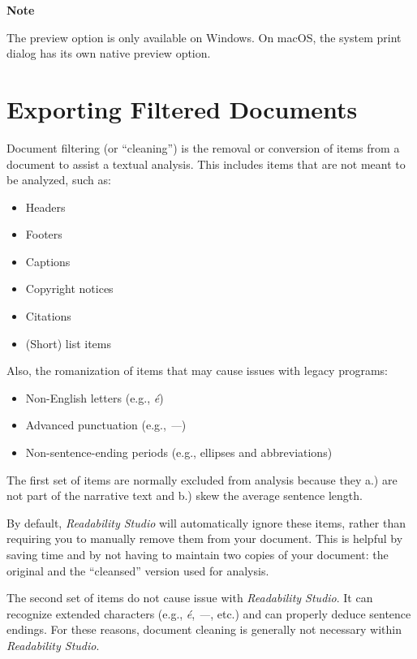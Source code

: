 \documentclass[
]{book}
\providecommand{\tightlist}{%
  \setlength{\itemsep}{0pt}\setlength{\parskip}{0pt}}
\newenvironment{notesection}
    {
    \begin{tcolorbox}[colframe=mediumblue,colback=lightblue,coltext=mediumblue,arc=3mm]
    \faLightbulb[regular] \textbf{Note} \newline
    }
    {
    \end{tcolorbox}
    }
\theoremstyle{definition}
\theoremstyle{definition}
\theoremstyle{definition}
\theoremstyle{definition}
\theoremstyle{remark}
\begin{document}
\begin{notesection}
The preview option is only available on Windows. On macOS, the system print dialog has its own native preview option.

\end{notesection}

\hypertarget{filtering-export}{%
\section{Exporting Filtered Documents}\label{filtering-export}}

Document filtering (or ``cleaning'') is the removal or conversion of items from a document to assist a textual analysis. This includes items that are not meant to be analyzed, such as:

\begin{itemize}
\tightlist
\item
  Headers
\item
  Footers
\item
  Captions
\item
  Copyright notices
\item
  Citations
\item
  (Short) list items
\end{itemize}

Also, the romanization of items that may cause issues with legacy programs:

\begin{itemize}
\tightlist
\item
  Non-English letters (e.g., \emph{é})
\item
  Advanced punctuation (e.g., \emph{---})
\item
  Non-sentence-ending periods (e.g., ellipses and abbreviations)
\end{itemize}

The first set of items are normally excluded from analysis because they a.) are not part of the narrative text and b.) skew the average sentence length.

By default, \emph{Readability Studio} will automatically ignore these items, rather than requiring you to manually remove them from your document. This is helpful by saving time and by not having to maintain two copies of your document: the original and the ``cleansed'' version used for analysis.

The second set of items do not cause issue with \emph{Readability Studio}. It can recognize extended characters (e.g., \emph{é}, \emph{---}, etc.) and can properly deduce sentence endings. For these reasons, document cleaning is generally not necessary within \emph{Readability Studio}.
\end{document}
